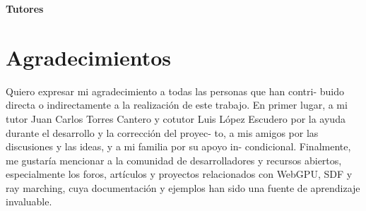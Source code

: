 \vspace{5cm}

\noindent \textbf{Tutores}

\chapter*{Agradecimientos}
\thispagestyle{empty}

       \vspace{1cm}


Quiero expresar mi agradecimiento a todas las personas que han contri-
buido directa o indirectamente a la realización de este trabajo.
En primer lugar, a mi tutor Juan Carlos Torres Cantero y cotutor Luis
López Escudero por la ayuda durante el desarrollo y la corrección del proyec-
to, a mis amigos por las discusiones y las ideas, y a mi familia por su apoyo in-
condicional.
\bigbreak
Finalmente, me gustaría mencionar a la comunidad de desarrolladores y
recursos abiertos, especialmente los foros, artículos y proyectos relacionados
con WebGPU, SDF y ray marching, cuya documentación y ejemplos han
sido una fuente de aprendizaje invaluable.